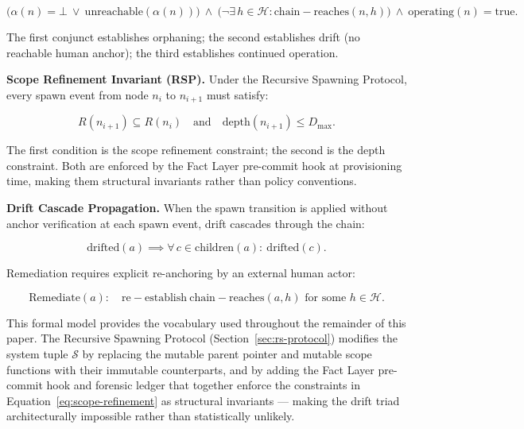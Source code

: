 \begin{equation}
\bigl( \alpha(n) = \bot \ \lor \ \mathrm{unreachable}(\alpha(n)) \bigr)\ \land\ \bigl( \neg\exists\, h \in \mathcal{H} : \mathrm{chain-reaches}(n, h) \bigr)\ \land\ \mathrm{operating}(n) = \mathrm{true}.
\label{eq:drift-condition}
\end{equation}

The first conjunct establishes orphaning; the second establishes drift (no reachable human anchor); the third establishes continued operation.

\medskip
\noindent\textbf{Scope Refinement Invariant (RSP).}
Under the Recursive Spawning Protocol, every spawn event from node $n_i$ to $n_{i+1}$ must satisfy:

\begin{equation}
R(n_{i+1}) \subseteq R(n_i) \quad \text{and} \quad \mathrm{depth}(n_{i+1}) \leq D_{\max}.
\label{eq:scope-refinement}
\end{equation}

The first condition is the scope refinement constraint; the second is the depth constraint. Both are enforced by the Fact Layer pre-commit hook at provisioning time, making them structural invariants rather than policy conventions.

\medskip
\noindent\textbf{Drift Cascade Propagation.}
When the spawn transition is applied without anchor verification at each spawn event, drift cascades through the chain:

\begin{equation}
\mathrm{drifted}(a) \implies \forall\, c \in \mathrm{children}(a):\ \mathrm{drifted}(c).
\label{eq:drift-propagation}
\end{equation}

Remediation requires explicit re-anchoring by an external human actor:

\begin{equation}
\mathrm{Remediate}(a):\quad \mathrm{re-establish}\ \mathrm{chain-reaches}(a, h) \text{ for some } h \in \mathcal{H}.
\label{eq:drift-remediation}
\end{equation}

\medskip
This formal model provides the vocabulary used throughout the remainder of this paper. The Recursive Spawning Protocol (Section~\ref{sec:rs-protocol}) modifies the system tuple $\mathcal{S}$ by replacing the mutable parent pointer and mutable scope functions with their immutable counterparts, and by adding the Fact Layer pre-commit hook and forensic ledger that together enforce the constraints in Equation~\ref{eq:scope-refinement} as structural invariants — making the drift triad architecturally impossible rather than statistically unlikely.
